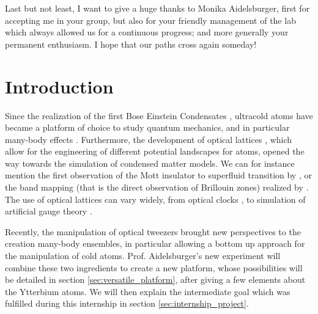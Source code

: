 \documentclass[11pt]{article}
\numberwithin{equation}{section}
\numberwithin{figure}{section}
\begin{document}
Last but not least, I want to give a huge thanks to Monika Aidelsburger, first for accepting me in your group, but also for your friendly management of the lab which always allowed us for a continuous progress; and more generally your permanent enthusiasm. I hope that our paths cross again someday!  

\vfill

\newpage

\thispagestyle{empty}

\tableofcontents

\vfill

\newpage

\setcounter{page}{1}

\section{Introduction}
\label{sec:introduction}

Since the realization of the first Bose Einstein Condensates \citep{1995_anderson, 1995_davis}, ultracold atoms have became a platform of choice to study quantum mechanics, and in particular many-body effects \citep{2008_bloch, 2012_bloch}. Furthermore, the development of optical lattices \citep[see e.g.][for a review]{2001_grynberg}, which allow for the engineering of different potential landscapes for atoms, opened the way towards the simulation of condensed matter models. We can for instance mention the first observation of the Mott insulator to superfluid transition by \cite{2002_greiner}, or the band mapping (that is the direct observation of Brillouin zones) realized by \cite{2001_greiner}. The use of optical lattices can vary widely, from optical clocks \citep{2005_takamoto}, to simulation of artificial gauge theory \citep{2010_gerbier}.

Recently, the manipulation of optical tweezers \citep{2016_barredo, 2016_endres} brought new perspectives to the creation many-body ensembles, in particular allowing a bottom up approach for the manipulation of cold atoms. Prof. Aidelsburger's new experiment will combine these two ingredients to create a new platform, whose possibilities will be detailed in section \ref{sec:versatile_platform}, after giving a few elements about the Ytterbium atoms. We will then explain the intermediate goal which was fulfilled during this internship in section \ref{sec:internship_project}. 
\end{document}
